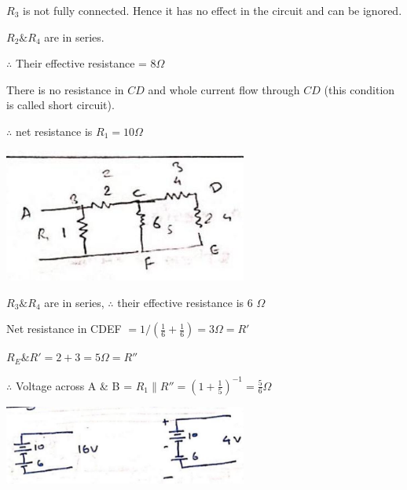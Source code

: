 \documentclass[12pt, a4paper]{article}
\newcommand{\figwidth}{8cm}
\begin{document}
\ans

$R_3$ is not fully connected. Hence it has no effect in the circuit and can be ignored.

$R_2 \& R_4$ are in series.

$\therefore$ Their effective resistance = $8 \Omega$
\bigskip

There is no resistance in $CD$ and whole current flow through $CD$ (this condition is called short circuit).

$\therefore$ net resistance is $R_1 = 10 \Omega$

\bigskip
{}

\begin{center}
	\includegraphics[max width=\figwidth]{2024_06_15_f9b8f5fbbfa74e15de4eg-2}
\end{center}

\ans

$R_3 \& R_4$ are in series, $\therefore$ their effective resistance is 6 $\Omega$

Net resistance in CDEF $=1/\left(\frac{1}{6}+\frac{1}{6}\right) = 3 \Omega = R'$

$R_E \& R'=2+3=5 \Omega = R''$

$\therefore$ Voltage across A \& B = $R_1 \| R''=\left(1+\frac{1}{5}\right)^{-1}=\frac{5}{6} \Omega$


\begin{center}
	\includegraphics[max width=\figwidth]{2024_06_15_f9b8f5fbbfa74e15de4eg-2(1)}
\end{center}
\end{document}
